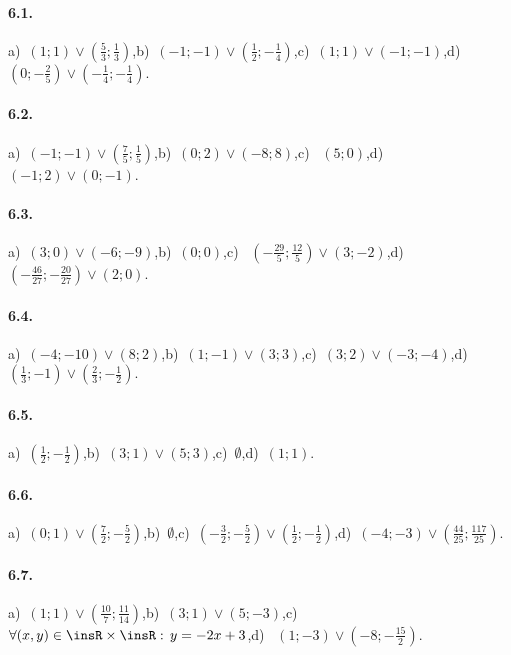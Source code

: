 \paragraph{6.1.} a)~$\left(1;1\right)\vee \left(\frac 5 3;\frac 1 3\right)$,\quad b)~$\left(-1;-1\right)\vee \left(\frac 1 2;-\frac 1 4\right)$,\quad c)~$\left(1;1\right)\vee \left(-1;-1\right)$,\quad d)~$\left(0;-\frac 2 5\right)\vee \left(-\frac 1 4;-\frac 1 4\right)$.

\paragraph{6.2.} a)~$\left(-1;-1\right)\vee \left(\frac{7}{5};\frac{1}{5}\right)$,\quad b)~$\left(0;2\right)\vee (-8;8)$,\quad c)~ $\left(5;0\right)$,\quad d)~$\left(-1;2\right)\vee (0;-1)$.

\paragraph{6.3.} a)~$\left(3;0\right)\vee \left(-6;-9\right)$,\quad b)~$\left(0;0\right)$,\quad c)~ $\left(-\frac{29} 5;\frac{12} 5\right)\vee (3;-2)$,\quad d)~$\left(-\frac{46}{27};-\frac{20}{27}\right)\vee (2;0)$.

\paragraph{6.4.} a)~$(-4;-10)\vee (8;2)$,\quad b)~$(1;-1)\vee (3;3)$,\quad c)~$(3;2)\vee (-3;-4)$,\quad d)~$\left(\frac{1}{3};-1\right)\vee \left(\frac{2}{3};-\frac{1}{2}\right)$.

\paragraph{6.5.} a)~$\left(\frac 1 2;-\frac 1 2\right)$,\quad b)~$\left(3;1\right)\vee \left(5;3\right)$,\quad c)~$\emptyset $,\quad d)~$\left(1;1\right)$.

\paragraph{6.6.} a)~$\left(0;1\right)\vee \left(\frac 7 2;-\frac 5 2\right)$,\quad b)~$\emptyset $,\quad c)~$\left(-\frac 3 2;-\frac 5 2\right)\vee \left(\frac 1 2;-\frac 1 2\right)$,\quad d)~$\left(-4;-3\right)\vee \left(\frac{44}{25};\frac{117}{25}\right)$.

\paragraph{6.7.} a)~$\left(1;1\right)\vee \left(\frac{10} 7;\frac{11}{14}\right)$,\quad b)~$\left(3;1\right)\vee \left(5;-3\right)$,\quad c)~$ \forall (x,y)\in \insR \times \insR:\,y=-2x+3$,\quad d)~ $\left(1;-3\right)\vee \left(-8;-\frac{15} 2\right)$.

